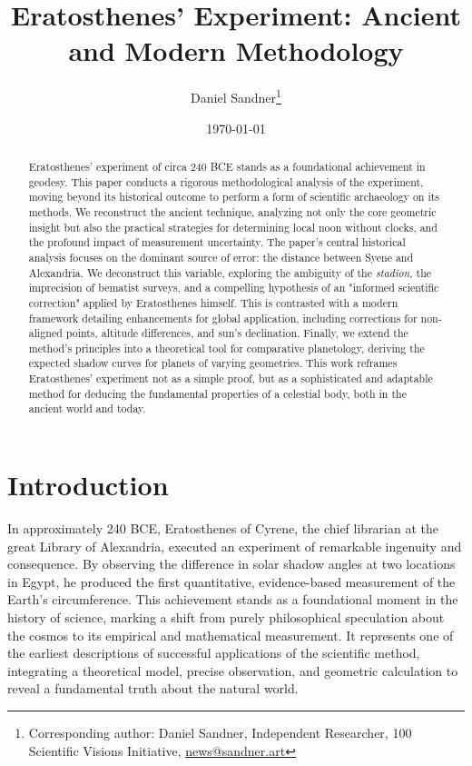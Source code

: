 \documentclass[11pt]{article}
\title{\textbf{Eratosthenes’ Experiment: Ancient and Modern Methodology}}
\author{{Daniel Sandner}\thanks{Corresponding author: Daniel Sandner, Independent Researcher, 100 Scientific Visions Initiative, \href{news@sandner.art}{news@sandner.art}}} %
\date{\today}
\begin{document}
\maketitle

\begin{abstract}
\noindent Eratosthenes' experiment of circa 240 BCE stands as a foundational achievement in geodesy. This paper conducts a rigorous methodological analysis of the experiment, moving beyond its historical outcome to perform a form of scientific archaeology on its methods. We reconstruct the ancient technique, analyzing not only the core geometric insight but also the practical strategies for determining local noon without clocks, and the profound impact of measurement uncertainty. The paper's central historical analysis focuses on the dominant source of error: the distance between Syene and Alexandria. We deconstruct this variable, exploring the ambiguity of the \textit{stadion}, the imprecision of bematist surveys, and a compelling hypothesis of an "informed scientific correction" applied by Eratosthenes himself. This is contrasted with a modern framework detailing enhancements for global application, including corrections for non-aligned points, altitude differences, and sun's declination. Finally, we extend the method's principles into a theoretical tool for comparative planetology, deriving the expected shadow curves for planets of varying geometries. This work reframes Eratosthenes' experiment not as a simple proof, but as a sophisticated and adaptable method for deducing the fundamental properties of a celestial body, both in the ancient world and today.
\end{abstract}

\section{Introduction}

In approximately 240 BCE, Eratosthenes of Cyrene, the chief librarian at the great Library of Alexandria, executed an experiment of remarkable ingenuity and consequence. By observing the difference in solar shadow angles at two locations in Egypt, he produced the first quantitative, evidence-based measurement of the Earth's circumference. This achievement stands as a foundational moment in the history of science, marking a shift from purely philosophical speculation about the cosmos to its empirical and mathematical measurement. It represents one of the earliest descriptions of successful applications of the scientific method, integrating a theoretical model, precise observation, and geometric calculation to reveal a fundamental truth about the natural world.
\end{document}

